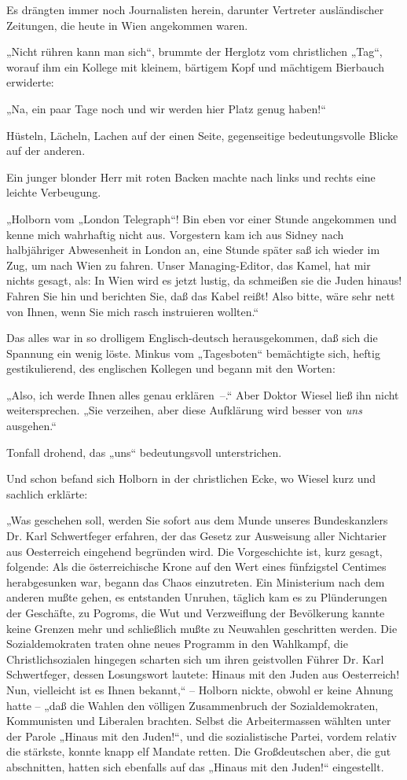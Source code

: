 Es drängten immer noch Journalisten herein, darunter Vertreter
ausländischer Zeitungen, die heute in Wien angekommen waren.

„Nicht rühren kann man sich“, brummte der Herglotz vom christlichen
„Tag“, worauf ihm ein Kollege mit kleinem, bärtigem Kopf und
mächtigem Bierbauch erwiderte:

„Na, ein paar Tage noch und wir werden hier Platz genug haben!“

Hüsteln, Lächeln, Lachen auf der einen Seite, gegenseitige
bedeutungsvolle Blicke auf der anderen.

Ein junger blonder Herr mit roten Backen machte nach
links und rechts eine leichte Verbeugung.

„Holborn vom „London Telegraph“! Bin eben vor einer Stunde
angekommen und kenne mich wahrhaftig nicht aus. Vorgestern kam ich
aus Sidney nach halbjähriger Abwesenheit in London an, eine Stunde
später saß ich wieder im Zug, um nach Wien zu fahren. Unser
Managing-Editor, das Kamel, hat mir nichts gesagt, als: In Wien
wird es jetzt lustig, da schmeißen sie die Juden hinaus! Fahren Sie
hin und berichten Sie, daß das Kabel reißt! Also bitte, wäre sehr
nett von Ihnen, wenn Sie mich rasch instruieren wollten.“

Das alles war in so drolligem Englisch-deutsch herausgekommen, daß
sich die Spannung ein wenig löste. Minkus vom „Tagesboten“
bemächtigte sich, heftig gestikulierend, des englischen Kollegen
und begann mit den Worten:

„Also, ich werde Ihnen alles genau erklären~–.“ Aber Doktor Wiesel
ließ ihn nicht weitersprechen. „Sie verzeihen, aber diese
Aufklärung wird besser von \emph{uns} ausgehen.“

Tonfall drohend, das „uns“ bedeutungsvoll unterstrichen.

Und schon befand sich Holborn in der christlichen Ecke, wo Wiesel
kurz und sachlich erklärte:

„Was geschehen soll, werden Sie sofort aus dem Munde unseres
Bundeskanzlers Dr. Karl Schwertfeger erfahren, der das Gesetz zur
Ausweisung aller Nichtarier aus Oesterreich eingehend begründen
wird. Die Vorgeschichte ist, kurz gesagt, folgende: Als die
österreichische Krone auf den Wert  eines fünfzigstel
Centimes herabgesunken war, begann das Chaos einzutreten. Ein
Ministerium nach dem anderen mußte gehen, es entstanden Unruhen,
täglich kam es zu Plünderungen der Geschäfte, zu Pogroms, die Wut
und Verzweiflung der Bevölkerung kannte keine Grenzen mehr und
schließlich mußte zu Neuwahlen geschritten werden. Die
Sozialdemokraten traten ohne neues Programm in den Wahlkampf, die
Christlichsozialen hingegen scharten sich um ihren geistvollen
Führer Dr. Karl Schwertfeger, dessen Losungswort lautete: Hinaus
mit den Juden aus Oesterreich! Nun, vielleicht ist es Ihnen
bekannt,“ – Holborn nickte, obwohl er keine Ahnung hatte – „daß die
Wahlen den völligen Zusammenbruch der Sozialdemokraten, Kommunisten
und Liberalen brachten. Selbst die Arbeitermassen wählten unter der
Parole „Hinaus mit den Juden!“, und die sozialistische Partei,
vordem relativ die stärkste, konnte knapp elf Mandate retten. Die
Großdeutschen aber, die gut abschnitten, hatten sich ebenfalls auf
das „Hinaus mit den Juden!“ eingestellt.


